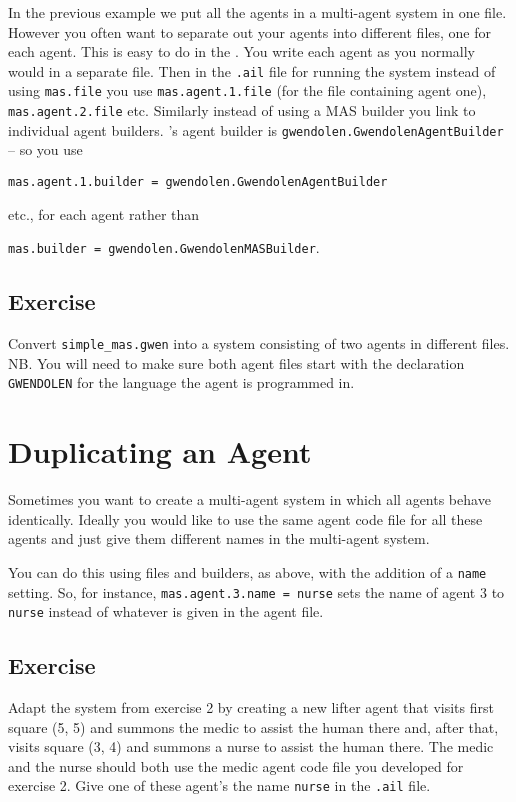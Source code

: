 \begin{sloppypar}
In the previous example we put all the agents in a multi-agent system in one file.  However you often want to separate out your agents into different files, one for each agent.  This is easy to do in the \ail.  You write each agent as you normally would in a separate file.  Then in the \texttt{.ail} file for running the system instead of using \texttt{mas.file} you use \texttt{mas.agent.1.file} (for the file containing agent one), \texttt{mas.agent.2.file} etc.  Similarly instead of using a MAS builder you link to individual agent builders.  \gwendolen's agent builder is \texttt{gwendolen.GwendolenAgentBuilder} -- so you use 
\end{sloppypar}
\begin{center}
\texttt{mas.agent.1.builder = gwendolen.GwendolenAgentBuilder} 
\end{center}
etc., for each agent rather than 
\begin{center}
\texttt{mas.builder = gwendolen.GwendolenMASBuilder}.
\end{center}

\subsection{Exercise}
Convert \texttt{simple\_mas.gwen} into a system consisting of two agents in different files.  NB.  You will need to make sure both agent files start with the declaration \texttt{GWENDOLEN} for the language the agent is programmed in.

\section{Duplicating an Agent}

Sometimes you want to create a multi-agent system in which all agents behave identically.  Ideally you would like to use the same agent code file for all these agents and just give them different names in the multi-agent system.

You can do this using files and builders, as above, with the addition of a \texttt{name} setting.  So, for instance, \texttt{mas.agent.3.name = nurse} sets the name of agent 3 to \texttt{nurse} instead of whatever is given in the agent file.

\subsection{Exercise}
Adapt the system from exercise 2 by creating a new lifter agent that visits first square (5, 5) and summons the medic to assist the human there and, after that, visits square (3, 4) and summons a nurse to assist the human there.  The medic and the nurse should both use the medic agent code file you developed for exercise 2.  Give one of these agent's the name \texttt{nurse} in the \texttt{.ail} file.


